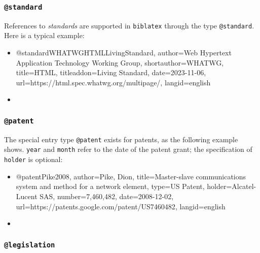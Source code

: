 
\subsubsection{\texttt{\bfseries @standard}}
\label{sec:@standard}

References to \emph{standards} are supported in \texttt{biblatex} through the
type \texttt{@standard}. Here is a typical example:
%
\begin{itemize}
\item[]
\begin{GenericCode}[numbers=none]
@standard{WHATWGHTMLLivingStandard,
  author={{Web Hypertext Application Technology Working Group}},
  shortauthor={WHATWG},
  title={HTML},
  titleaddon={Living Standard},
  date={2023-11-06},
  url={https://html.spec.whatwg.org/multipage/},
  langid={english}
}
\end{GenericCode}
\item[\cite{WHATWGHTMLLivingStandard}] 
\end{itemize}
%


\subsubsection{\texttt{\bfseries @patent}}
\label{sec:@patent}

The special entry type \texttt{@patent} exists for patents, as the following
example shows. \texttt{year} and \texttt{month} refer to the date of the patent
grant; the specification of \texttt{holder} is optional:
%
\begin{itemize}
\item[]
\begin{GenericCode}[numbers=none]
@patent{Pike2008,
  author={Pike, Dion},
  title={Master-slave communications system and method for a network element},
  type={US Patent},
  holder={Alcatel-Lucent SAS},
  number={7,460,482},
  date={2008-12-02},
  url={https://patents.google.com/patent/US7460482},
  langid={english}
}
\end{GenericCode}
\item[\cite{Pike2008}] 
\end{itemize}
%


\subsubsection{\texttt{\bfseries @legislation}}
\label{sec:@legislation}

